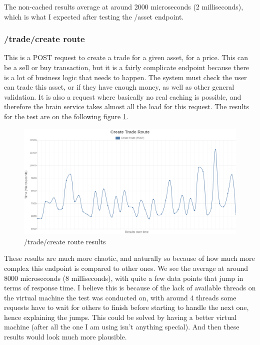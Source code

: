 \documentclass[titlepage]{article}
\begin{document}
The non-cached results average at around 2000 microseconds (2 milliseconds), which is what I expected after testing the /asset endpoint.

\pagebreak
\subsubsection{/trade/create route}
This is a POST request to create a trade for a given asset, for a price. This can be a sell or buy transaction, but it is a fairly complicate endpoint because there is a lot of business logic that needs to happen. The system must check the user can trade this asset, or if they have enough money, as well as other general validation. It is also a request where basically no real caching is possible, and therefore the brain service takes almost all the load for this request. The results for the test are on the following figure \ref{create-trade}.

\begin{figure}[h!]
\includegraphics[width=\textwidth]{../results/create-trade.png}
  \caption{/trade/create route results}
  \label{create-trade}
\end{figure}

These results are much more chaotic, and naturally so because of how much more complex this endpoint is compared to other ones. We see the average at around 8000 microseconds (8 milliseconds), with quite a few data points that jump in terms of response time. I believe this is because of the lack of available threads on the virtual machine the test was conducted on, with around 4 threads some requests have to wait for others to finish before starting to handle the next one, hence explaining the jumps. This could be solved by having a better virtual machine (after all the one I am using isn't anything special). And then these results would look much more plausible. \\
\end{document}
